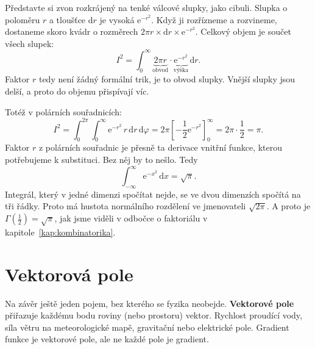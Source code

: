 Představte si zvon rozkrájený na tenké válcové slupky, jako cibuli. Slupka o poloměru $r$ a tloušťce $\mathrm{d}r$ je vysoká $\mathrm{e}^{-r^2}$. Když ji rozřízneme a rozvineme, dostaneme skoro kvádr o rozměrech $2\pi r\times\mathrm{d}r\times\mathrm{e}^{-r^2}$. Celkový objem je součet všech slupek:
\begin{equation*}
  I^2 = \int_0^{\infty}\underbrace{2\pi r}_{\text{obvod}}\cdot\underbrace{\mathrm{e}^{-r^2}}_{\text{výška}}\,\mathrm{d}r.
\end{equation*}
Faktor $r$ tedy není žádný formální trik, je to obvod slupky. Vnější slupky jsou delší, a proto do objemu přispívají víc.

Totéž v polárních souřadnicích:
\begin{equation*}
  I^2 = \int_0^{2\pi}\int_0^{\infty}\mathrm{e}^{-r^2}\,r\,\mathrm{d}r\,\mathrm{d}\varphi = 2\pi\left[-\frac{1}{2}\mathrm{e}^{-r^2}\right]_0^{\infty} = 2\pi\cdot\frac{1}{2} = \pi.
\end{equation*}
Faktor $r$ z polárních souřadnic je přesně ta derivace vnitřní funkce, kterou potřebujeme k substituci. Bez něj by to nešlo. Tedy
\begin{equation*}
  \int_{-\infty}^{\infty}\mathrm{e}^{-x^2}\,\mathrm{d}x = \sqrt{\pi}.
\end{equation*}
Integrál, který v jedné dimenzi spočítat nejde, se ve dvou dimenzích spočítá na tři řádky. Proto má hustota normálního rozdělení ve jmenovateli $\sqrt{2\pi}$. A proto je $\Gamma\!\left(\frac{1}{2}\right) = \sqrt{\pi}$, jak jsme viděli v odbočce o faktoriálu v kapitole~\ref{kap:kombinatorika}.

\section{Vektorová pole}

Na závěr ještě jeden pojem, bez kterého se fyzika neobejde. \textbf{Vektorové pole} přiřazuje každému bodu roviny (nebo prostoru) vektor. Rychlost proudící vody, síla větru na meteorologické mapě, gravitační nebo elektrické pole. Gradient funkce je vektorové pole, ale ne každé pole je gradient.

\begin{center}
\end{center}

